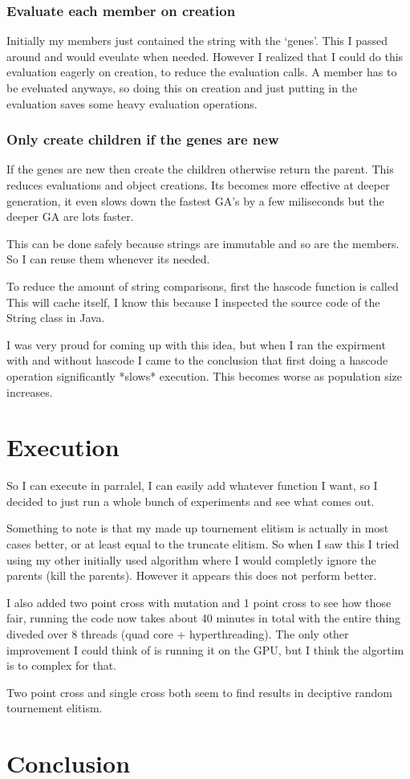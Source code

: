 \documentclass{article}
\begin{document}
\subsubsection{Evaluate each member on creation}
Initially my members just contained the string with the `genes'. This I passed
around and would eveulate when needed. However I realized that I could do this
evaluation eagerly on creation, to reduce the evaluation calls. A member has
to be eveluated anyways, so doing this on creation and just putting in the
evaluation saves some heavy evaluation operations.

\subsubsection{Only create children if the genes are new}
If the genes are new then create the children otherwise return the parent.
This reduces evaluations and object creations. Its becomes more effective
at deeper generation, it even slows down the fastest GA's by a few miliseconds
but the deeper GA are lots faster.

This can be done safely because strings are immutable and so are the members.
So I can reuse them whenever its needed.

To reduce the amount of string comparisons, first the hascode function is called
This will cache itself, I know this because I inspected the source code of the
String class in Java.

I was very proud for coming up with  this idea, but when I ran the expirment with
and without hascode I came to the conclusion that first doing a hascode operation
significantly *slows* execution. This becomes worse as population size increases.

\section{Execution}
So I can execute in parralel, I can easily add whatever function I want, so
I decided to just run a whole bunch of experiments and see what comes out.

Something to note is that my made up tournement elitism is actually in most
cases better, or at least equal to the truncate elitism. So when I saw
this I tried using my other initially used algorithm where I would completly
ignore the parents (kill the parents). However it appears this does not 
perform better.

I also added two point cross with mutation and 1 point cross to see how 
those fair, running the code now takes about 40 minutes in total with the
entire thing diveded over 8 threads (quad core + hyperthreading). The only
other improvement I could think of is running it on the GPU, but I think
the algortim is to complex for that.

Two point cross and single cross both seem to find results in deciptive 
random tournement elitism.

\newpage


\section{Conclusion}
\end{document}
